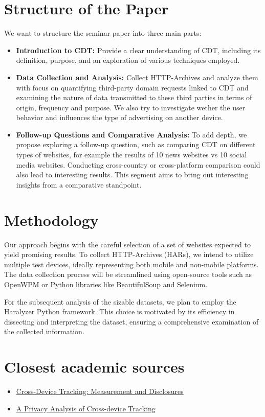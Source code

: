 \documentclass[a4paper,12pt]{article}
\begin{document}
\section*{Structure of the Paper}
We want to structure the seminar paper into three main parts:
\begin{itemize}
    \item \textbf{Introduction to CDT:} Provide a clear understanding of CDT, including its definition, purpose, and an exploration of various techniques employed.
    \item \textbf{Data Collection and Analysis:} Collect HTTP-Archives and analyze them with focus on quantifying third-party domain requests linked to CDT and examining the nature of data transmitted to these third parties in terms of origin, frequency and purpose. We also try to investigate wether the user behavior and influences the type of advertising on another device.
    \item \textbf{Follow-up Questions and Comparative Analysis:} To add depth, we propose exploring a follow-up question, such as comparing CDT on different types of websites, for example the results of 10 news websites vs 10 social media websites. Conducting cross-country or cross-platform comparison could also lead to interesting results. This segment aims to bring out interesting insights from a comparative standpoint.
\end{itemize}

\section*{Methodology}
Our approach begins with the careful selection of a set of websites expected to yield promising results. 
To collect HTTP-Archives (HARs), we intend to utilize multiple test devices, ideally representing both mobile and non-mobile platforms. 
The data collection process will be streamlined using open-source tools such as OpenWPM or Python libraries like BeautifulSoup and Selenium.

For the subsequent analysis of the sizable datasets, we plan to employ the Haralyzer Python framework. 
This choice is motivated by its efficiency in dissecting and interpreting the dataset, ensuring a comprehensive examination of the collected information.

\section*{Closest academic sources}
\begin{itemize}
    \item \href{https://www.hillwebcreations.com/wp-content/uploads/2017/05/cross-device-tracking-to-determine-consumer-behavior-otech.pdf}{Cross-Device Tracking: Measurement and Disclosures}
    \item \href{https://www.usenix.org/system/files/conference/usenixsecurity17/sec17-zimmeck.pdf}{A Privacy Analysis of Cross-device Tracking}
\end{itemize}
\end{document}
